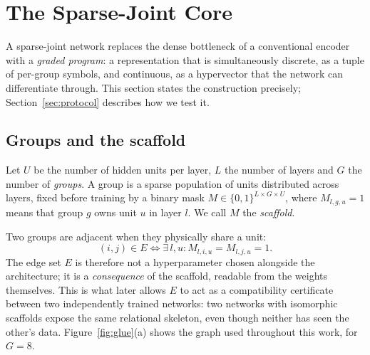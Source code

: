 %
%
%

\section{The Sparse-Joint Core}
\label{sec:architecture}

A sparse-joint network replaces the dense bottleneck of a conventional encoder
with a \emph{graded program}: a representation that is simultaneously discrete,
as a tuple of per-group symbols, and continuous, as a hypervector that the
network can differentiate through. This section states the construction
precisely; Section~\ref{sec:protocol} describes how we test it.

\subsection{Groups and the scaffold}

Let $U$ be the number of hidden units per layer, $L$ the number of layers and
$G$ the number of \emph{groups}. A group is a sparse population of units
distributed across layers, fixed before training by a binary mask
$M \in \{0,1\}^{L \times G \times U}$, where $M_{l,g,u}=1$ means that group $g$
owns unit $u$ in layer $l$. We call $M$ the \emph{scaffold}.

Two groups are adjacent when they physically share a unit:
\begin{equation}
  (i,j) \in E \iff \exists\, l,u : M_{l,i,u} = M_{l,j,u} = 1 .
  \label{eq:edges}
\end{equation}
The edge set $E$ is therefore not a hyperparameter chosen alongside the
architecture; it is a \emph{consequence} of the scaffold, readable from the
weights themselves. This is what later allows $E$ to act as a compatibility
certificate between two independently trained networks: two networks with
isomorphic scaffolds expose the same relational skeleton, even though neither
has seen the other's data. Figure~\ref{fig:glue}(a) shows the graph used
throughout this work, for $G=8$.

